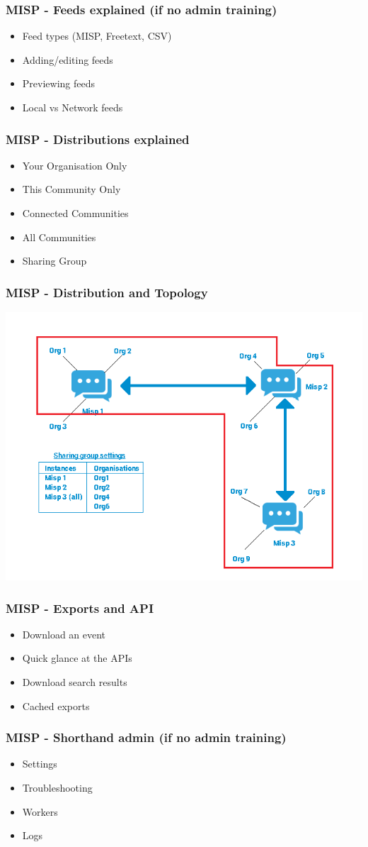 \begin{frame}
    \frametitle{MISP - Feeds explained (if no admin training)}
    \begin{itemize}
        \item Feed types (MISP, Freetext, CSV)
        \item Adding/editing feeds
        \item Previewing feeds
        \item Local vs Network feeds
    \end{itemize}
\end{frame}

\begin{frame}
    \frametitle{MISP - Distributions explained}
    \begin{itemize}
        \item Your Organisation Only
        \item This Community Only
        \item Connected Communities
        \item All Communities
        \item Sharing Group
    \end{itemize}
\end{frame}

\begin{frame}
    \frametitle{MISP - Distribution and Topology}
    \includegraphics[scale=0.45]{screenshots/sync.png}
\end{frame}

\begin{frame}
    \frametitle{MISP - Exports and API}
    \begin{itemize}
        \item Download an event
        \item Quick glance at the APIs
        \item Download search results
        \item Cached exports
    \end{itemize}
\end{frame}

\begin{frame}
    \frametitle{MISP - Shorthand admin (if no admin training)}
    \begin{itemize}
        \item Settings
        \item Troubleshooting
        \item Workers
        \item Logs
    \end{itemize}
\end{frame}
